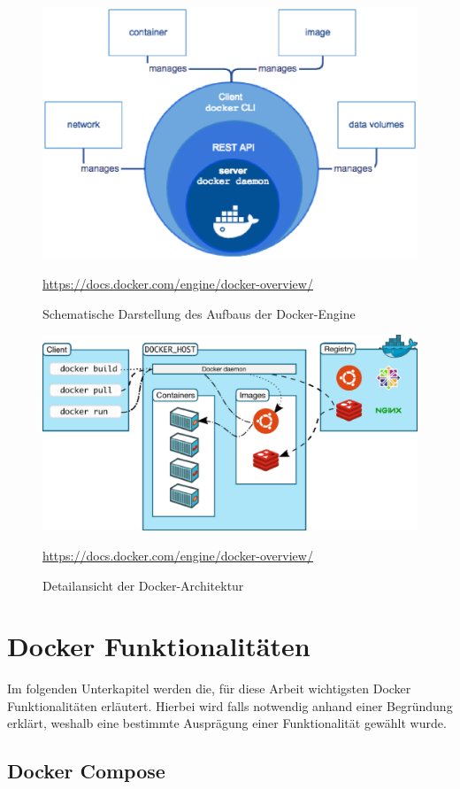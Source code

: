 \begin{figure}
	\centering
	\includegraphics[width=0.7\linewidth]{figures/DockerEngine}
	\caption[Aufbau Docker-Engine]{Schematische Darstellung des Aufbaus der Docker-Engine}
	\label{fig:dockerengine}
	\tiny{\quelle\url{https://docs.docker.com/engine/docker-overview/}}
\end{figure}

\begin{figure}
	\centering
	\includegraphics[width=0.7\linewidth]{figures/DockerArchitecture}
	\caption[Detailansicht der Docker-Architektur]{Detailansicht der Docker-Architektur}
	\label{fig:dockerarchitecture}
	\tiny{\quelle\url{https://docs.docker.com/engine/docker-overview/}}
\end{figure}

\section{Docker Funktionalitäten}
\label{c:funktionalität}

Im folgenden Unterkapitel werden die, für diese Arbeit wichtigsten Docker Funktionalitäten erläutert.
Hierbei wird falls notwendig anhand einer Begründung erklärt, weshalb eine bestimmte Ausprägung einer Funktionalität gewählt wurde.

\subsection{Docker Compose}

